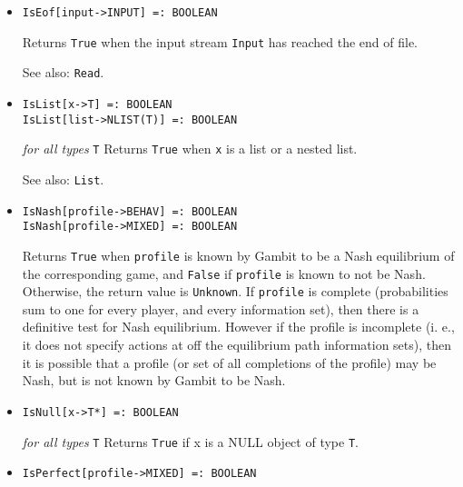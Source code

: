 \begin{itemize}
\item{}
\protect \large \begin{verbatim}
IsEof[input->INPUT] =: BOOLEAN
\end{verbatim}\normalsize

\bd
Returns \verb+True+ when the input stream \verb+Input+ has reached the
end of file.
\item [See also:] \verb+Read+.
\ed

\item{}
\protect \large \begin{verbatim}
IsList[x->T] =: BOOLEAN 
IsList[list->NLIST(T)] =: BOOLEAN 
\end{verbatim}\normalsize

{\it for all types} {\tt T}
\bd 
Returns \verb+True+ when \verb+x+ is a list or a nested list.
\item
[See also:] \verb+List+.
\ed

\item{}
\protect \large \begin{verbatim}
IsNash[profile->BEHAV] =: BOOLEAN 
IsNash[profile->MIXED] =: BOOLEAN 
\end{verbatim}\normalsize

\bd
Returns \verb+True+ when \verb+profile+ is known by Gambit to be a
Nash equilibrium of the corresponding game, and \verb+False+ if
\verb+profile+ is known to not be Nash.  Otherwise, the return value
is \verb+Unknown+.  If \verb+profile+ is complete (probabilities sum
to one for every player, and every information set), then there is a
definitive test for Nash equilibrium.  However if the profile is
incomplete (i. e., it does not specify actions at off the equilibrium
path information sets), then it is possible that a profile (or set of
all completions of the profile) may be Nash, but is not known by
Gambit to be Nash.
\ed

\item{}
\protect \large \begin{verbatim}
IsNull[x->T*] =: BOOLEAN 
\end{verbatim}\normalsize

{\it for all types} {\tt T}
\bd
Returns \verb+True+ if x is a NULL object of type \verb+T+.  
\ed

\item{}
\protect \large \begin{verbatim}
IsPerfect[profile->MIXED] =: BOOLEAN 
\end{verbatim}\normalsize


\end{itemize}
